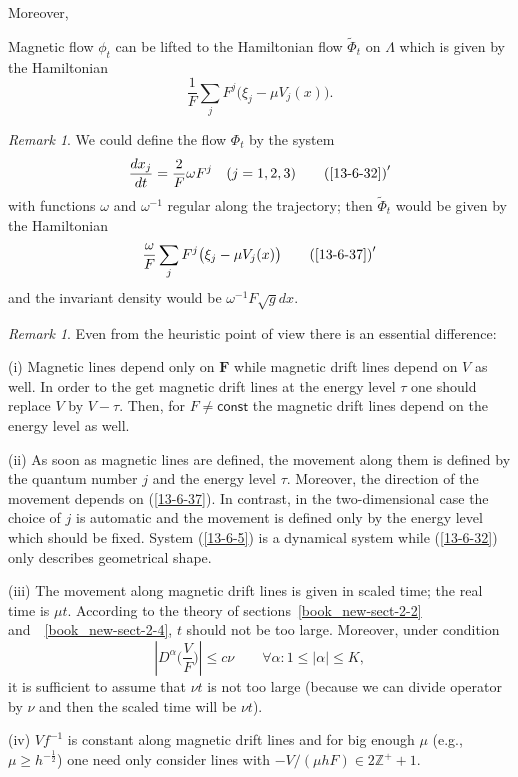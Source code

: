 \documentclass[12pt,oneside,openany,article]{memoir}
\numberwithin{equation}{chapter}
\theoremstyle{plain}
\theoremstyle{definition}
\theoremstyle{remark}
\newtheorem{remark}[theorem]{Remark}
\numberwithin{equation}{chapter}
\newenvironment{claim}[1][{\textup{(\theequation)}}]{\refstepcounter{equation}\vglue10pt
\begin{trivlist}
\item[{\hskip\labelsep#1}]}{\vglue10pt\end{trivlist}}
\begin{document}
Moreover,
\begin{claim}\label{13-6-36}Magnetic flow $\phi_t$ can be lifted to the Hamiltonian flow $\tilde{\Phi}_t$ on $\Lambda $ which is given by the Hamiltonian
\begin{equation}
{\frac{1}{F}}\sum_j F^j\bigl(\xi _j-\mu V_j(x)\bigr).
\label{13-6-37}\end{equation}
\end{claim}

\begin{remark}\label{rem-13-6-12}
We could define the flow $\Phi _t$ by the system
\begin{equation}
\frac{dx_j}{dt} = \frac{2}{F} \omega F^j \quad (j=1,2,3)
\tag*{$\textup{(\ref*{13-6-32})}'$}\label{13-6-32-'}
\end{equation}
with functions $\omega$ and $\omega^{-1}$ regular along the trajectory; then $\tilde{\Phi}_t$ would be given by the Hamiltonian
\begin{equation}
\frac{\omega}{F} \sum_j F^j\bigl(\xi _j-\mu V_j(x)\bigr)
\tag*{$\textup{(\ref*{13-6-37})}'$}\label{13-6-37-'}
\end{equation}
and the invariant density would be $\omega^{-1} F \sqrt{g} dx$.
\end{remark}

\begin{remark}\label{rem-13-6-14}
Even from the heuristic point of view there is an essential difference:

\medskip\noindent
(i) Magnetic lines depend only on ${\mathbf F}$ while magnetic drift lines depend on $V$ as well. In order to the get magnetic drift lines at the energy level $\tau$ one should replace $V$ by $V-\tau $. Then, for $F\ne {{\mathsf{const}}}$ the magnetic drift lines depend on the energy level as well.

\medskip\noindent
(ii) As soon as magnetic lines are defined, the movement along them is defined by the quantum number $j$ and the energy level $\tau $. Moreover, the direction of the movement depends on (\ref{13-6-37}). In contrast, in the two-dimensional case the choice of $j$ is automatic and the movement is defined only by the energy level which should be fixed. System (\ref{13-6-5}) is a dynamical system while (\ref{13-6-32}) only describes geometrical shape.

\medskip\noindent
(iii) The movement along magnetic drift lines is given in scaled time; the real
time is $\mu t$. According to the theory of sections~\ref{book_new-sect-2-2} and~~\ref{book_new-sect-2-4}, $t$ should not be too large. Moreover, under condition \begin{equation}
|D^\alpha \bigl({\frac{V}{F}}\bigr)|\le c\nu \qquad \forall \alpha :1\le |\alpha |\le K,
\label{13-3-85}
\end{equation}
it is sufficient to assume that $\nu t$ is not too large (because we can divide operator by $\nu $ and then the scaled time will be $\nu t$).

\medskip\noindent
(iv) $Vf^{-1}$ is constant along magnetic drift lines and for big enough $\mu $
(e.g., $\mu \ge h ^{-\frac{1}{2}}$) one need only consider lines with
$-V/(\mu hF)\in 2{{\mathbb{Z}}} ^++1$.
\end{remark}
\end{document}
